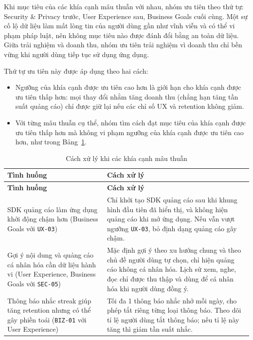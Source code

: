 Khi mục tiêu của các khía cạnh mâu thuẫn với nhau, nhóm ưu tiên theo thứ tự: Security \& Privacy trước, User Experience sau, Business Goals cuối cùng.
Một sự cố lộ dữ liệu làm mất lòng tin của người dùng gần như vĩnh viễn và có thể vi phạm pháp luật, nên không mục tiêu nào được đánh đổi bằng an toàn dữ liệu.
Giữa trải nghiệm và doanh thu, nhóm ưu tiên trải nghiệm vì doanh thu chỉ bền vững khi người dùng tiếp tục sử dụng ứng dụng.

Thứ tự ưu tiên này được áp dụng theo hai cách:
\begin{itemize}
    \item Ngưỡng của khía cạnh được ưu tiên cao hơn là giới hạn cho khía cạnh được ưu tiên thấp hơn: mọi thay đổi nhằm tăng doanh thu (chẳng hạn tăng tần suất quảng cáo) chỉ được giữ lại nếu các chỉ số UX và retention không giảm.
    \item Với từng mâu thuẫn cụ thể, nhóm tìm cách đạt mục tiêu của khía cạnh được ưu tiên thấp hơn mà không vi phạm ngưỡng của khía cạnh được ưu tiên cao hơn, như trong Bảng~\ref{tab:quality-conflicts}.
\end{itemize}

\begingroup
\small
\begin{longtable}{@{}>{\raggedright\arraybackslash}p{5.0cm}>{\raggedright\arraybackslash}p{10.4cm}@{}}
\caption{Cách xử lý khi các khía cạnh mâu thuẫn}
\label{tab:quality-conflicts} \\
\toprule
\textbf{Tình huống} & \textbf{Cách xử lý} \\
\midrule
\endfirsthead
\toprule
\textbf{Tình huống} & \textbf{Cách xử lý} \\
\midrule
\endhead
\bottomrule
\endfoot
SDK quảng cáo làm ứng dụng khởi động chậm hơn (Business Goals với \texttt{UX-03}) &
Chỉ khởi tạo SDK quảng cáo sau khi khung hình đầu tiên đã hiển thị, và không hiện quảng cáo khi mở ứng dụng. Nếu vẫn vượt ngưỡng \texttt{UX-03}, bỏ định dạng quảng cáo gây chậm. \\
\midrule
Gợi ý nội dung và quảng cáo cá nhân hóa cần dữ liệu hành vi (User Experience, Business Goals với \texttt{SEC-05}) &
Mặc định gợi ý theo xu hướng chung và theo chủ đề người dùng tự chọn, chỉ hiện quảng cáo không cá nhân hóa. Lịch sử xem, nghe, đọc chỉ được thu thập và dùng để cá nhân hóa khi người dùng đồng ý. \\
\midrule
Thông báo nhắc streak giúp tăng retention nhưng có thể gây phiền toái (\texttt{BIZ-01} với User Experience) &
Tối đa 1 thông báo nhắc nhở mỗi ngày, cho phép tắt riêng từng loại thông báo. Theo dõi tỉ lệ người dùng tắt thông báo; nếu tỉ lệ này tăng thì giảm tần suất nhắc. \\
\end{longtable}
\endgroup

